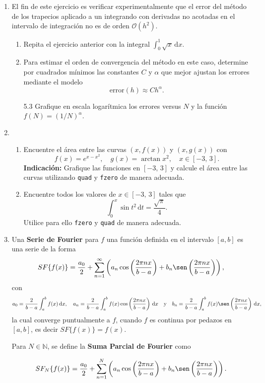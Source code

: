 \documentclass[letterpaper,11pt]{article}
\begin{document}
\begin{enumerate}
\item El fin de este ejercicio es verificar experimentalmente que el error del m\'etodo de los trapecios aplicado a un integrando con derivadas no acotadas en el intervalo de integraci\'on no es de orden $\mathcal{O}(h^2)$.
\begin{enumerate}
\item Repita el ejercicio anterior con la integral  $\int_0^1\sqrt{x}\,\mathrm{d}x$.
\item Para estimar el orden de convergencia del m\'etodo en este caso, determine por cuadrados
m\'inimos las constantes $C$ y $\alpha$ que mejor ajustan los errores mediante el modelo
$$\textrm{error}(h) \approx Ch^{\alpha}.$$
\item[5.3] Grafique en escala logar\'itmica los errores versus $N$ y la funci\'on $f(N) = (1/N)^{\alpha}$.
\end{enumerate}

\item
\begin{enumerate}
\item Encuentre el \'area entre las curvas $(x,f(x))$ y $(x,g(x))$ con
$$
f(x)=e^{x-x^2},\quad g(x) = \arctan x^2, \quad x \in [-3,\,3].
$$
{\bf Indicaci\'on:} Grafique las funciones en $[-3,\,3]$ y calcule el \'area entre las curvas utilizando \verb+quad+ y \verb+fzero+ de manera adecuada.

\item Encuentre todos los valores de $x \in [-3,\,3]$ tales que
$$
\int_0^x\sin t^2 \, \mathrm{d}t=\frac{\sqrt{\pi}}4.
$$
Utilice para ello \verb+fzero+ y \verb+quad+ de manera adecuada.
\end{enumerate}


\item 
Una \textbf{Serie de Fourier} para $f$ una funci\'on definida en el intervalo $[a,b]$ es una serie de la forma
$$SF\{f(x)\}=\dfrac{a_0}{2}+\sum_{n=1}^{\infty}\left(a_n\cos\left(\dfrac{2\pi nx}{b-a}\right)+b_n\sen\left(\dfrac{2\pi nx}{b-a}\right)\right),
$$
con
$$
a_0=\dfrac{2}{b-a}\int_{a}^{b}f(x)\,\mathrm{d}x,\quad a_n=\dfrac{2}{b-a}\int_{a}^{b}f(x)\cos\left(\dfrac{2\pi nx}{b-a}\right)\,\mathrm{d}x \quad \textrm{y}\quad b_n=\dfrac{2}{b-a}\int_{a}^{b}f(x)\sen\left(\dfrac{2\pi nx}{b-a}\right)\,\mathrm{d}x, 
$$
la cual converge puntualmente a $f$, cuando $f$ es continua por pedazos en $[a, b]$, es decir $SF\{f(x)\}=f(x)$.

Para $N\in\mathbb{N}$, se define la \textbf{Suma Parcial de Fourier} como

$$
SF_N\{f(x)\}=\dfrac{a_0}{2}+\sum_{n=1}^{N}\left(a_n\cos\left(\dfrac{2\pi nx}{b-a}\right)+b_n\sen\left(\dfrac{2\pi nx}{b-a}\right)\right).
$$


\end{enumerate}
\end{document}
